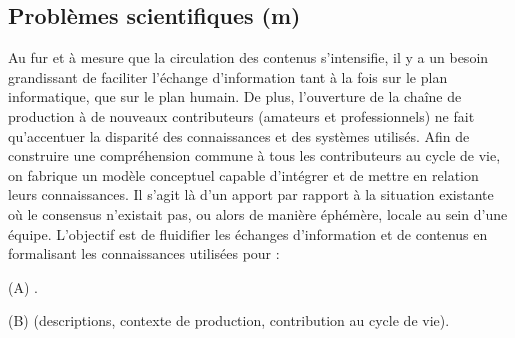 \begin{liste}
\end{liste}



\subsection{Problèmes scientifiques (m)}\label{sec:scien}
Au fur et à mesure que la circulation des contenus s'intensifie, il y a un besoin grandissant de faciliter l'échange d'information tant à la fois sur le plan informatique, que sur le plan humain. 
De plus, l'ouverture de la chaîne de production à de nouveaux contributeurs (amateurs et professionnels) ne fait qu'accentuer la disparité des connaissances et des systèmes utilisés. 
Afin de construire une compréhension commune à tous les contributeurs au cycle de vie, on fabrique un modèle conceptuel capable d'intégrer et de mettre en relation leurs connaissances. 
Il s'agit là d'un apport par rapport à la situation existante où le consensus n'existait pas, ou alors de manière éphémère, locale au sein d'une équipe.
L'objectif est de fluidifier les échanges d'information et de contenus en formalisant les connaissances utilisées pour :
\begin{liste}
	\item[(A)] .
	\item[(B)]  (descriptions, contexte de production, contribution au cycle de vie).
\end{liste}

